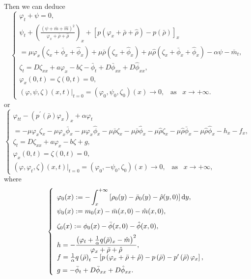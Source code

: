\documentclass[11pt]{article}
\theoremstyle{plain}
\numberwithin{equation}{section}
\begin{document}
	Then we can deduce 
	\begin{equation}\label{3.10}
		\left\{
		\begin{array}{lr}
			\varphi_t+\psi=0,\\[2mm]
			\psi_t+\displaystyle\left(\frac{(\psi+\bar m+\hat m)^2}{\varphi_x+\bar\rho+\hat\rho}\right)_x+\left[p(\varphi_x+\bar\rho+\hat\rho)-p(\bar\rho)\right]_x\\[2mm]
			=\mu \varphi_x(\zeta_x+\bar\phi_x+\hat\phi_x)+\mu\bar\rho(\zeta_x+\hat\phi_x)+\mu\hat\rho(\zeta_x+\bar\phi_x+\hat\phi_x)-\alpha \psi-\bar m_t,\\[2mm]
			\zeta_t=D\zeta_{xx}+a\varphi_x-b\zeta-\bar\phi_t+D\bar\phi_{xx}+D\hat\phi_{xx},\\[2mm]
			\varphi_x(0,t)=\zeta(0,t)=0,\\[2mm]
			(\varphi,\psi,\zeta)(x,t)|_{t=0}=(\varphi_0,\psi_0,\zeta_0)(x)\to0,\;\;\;\mbox{as}\;\;\; x\to+\infty.
		\end{array}
		\right.
	\end{equation}
	or
	\begin{equation}\label{3.11}
		\left\{
		\begin{array}{lr}
			\varphi_{tt}-\left(p^{\prime}(\bar\rho)\varphi_x\right)_x	+\alpha \varphi_t\\[2mm]
			=-\mu \varphi_x\zeta_x-\mu \varphi_x\bar\phi_x-\mu \varphi_x\hat\phi_x-\mu\bar\rho\zeta_x-\mu\bar\rho\hat\phi_x-\mu\hat\rho\zeta_x-\mu\hat\rho\bar\phi_x-\mu\hat\rho\hat\phi_x-h_x-f_x,\\[2mm]
			\zeta_t=D\zeta_{xx}+a\varphi_x-b\zeta+g,\\[2mm]
			\varphi_x(0,t)=\zeta(0,t)=0,\\[2mm]
			\left(\varphi,\varphi_t,\zeta\right)(x,t)|_{t=0}=(\varphi_0,-\psi_0,\zeta_0)(x)\to0,\;\;\;\mbox{as}\;\;\; x\to+\infty,
		\end{array}
		\right.
	\end{equation}
	where
	\begin{equation}\label{3.12}
		\left\{
		\begin{array}{lr}
		\varphi_0(x):= -\displaystyle\int^{+\infty}_{x} \left[\rho_{0}(y)-\bar{\rho}_0(y)-\hat{\rho}(y,0) \right] {\rm d}y,\\[3mm]
\psi_0(x):=m_0(x)-\bar{m}(x,0)-\hat{m}(x,0),\\[3mm]
\zeta_0(x):=\phi_0(x)-\bar{\phi}(x,0)-\hat{\phi}(x,0),\\[2mm]
			h=-\displaystyle\frac{\left(\varphi_t+\frac{1}{\alpha}q(\bar\rho)_x-\hat m\right)^2}{\varphi_x+\bar\rho+\hat\rho},\\[2mm]
			f=\frac{1}{\alpha}q\left(\bar\rho\right)_t-\left[p\left(\varphi_x+\bar\rho+\hat\rho\right)-p\left(\bar\rho\right)-p^{\prime}\left(\bar\rho\right)\varphi_x\right],\\[2mm]
			g=-\bar\phi_t+D\bar\phi_{xx}+D\hat\phi_{xx}.
		\end{array}
		\right.
	\end{equation}
\end{document}
